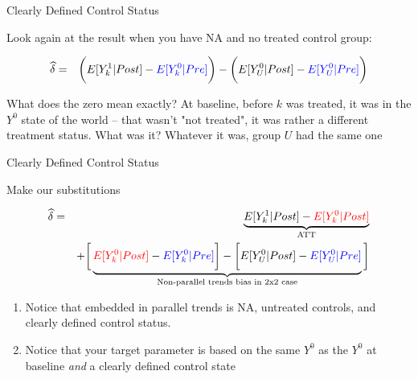 \documentclass{beamer}
\begin{document}
\begin{frame}{Clearly Defined Control Status}

Look again at the result when you have NA and no treated control group:

\begin{eqnarray*}
\widehat{\delta} &=& \bigg ( E[Y^1_k|Post] - \textcolor{blue}{E[Y^0_k|Pre]} \bigg ) - \bigg ( E[Y^0_U | Post ] - \textcolor{blue}{E[ Y^0_U | Pre]} \bigg) \\
\end{eqnarray*}

What does the zero mean exactly?  At baseline, before $k$ was treated, it was in the $Y^0$ state of the world -- that wasn't "not treated", it was rather a different treatment status.  What was it?  Whatever it was, group $U$ had the same one

\end{frame}

\begin{frame}{Clearly Defined Control Status}

Make our substitutions

\begin{eqnarray*}
\widehat{\delta} &=& \underbrace{E[Y^1_k | Post] - \textcolor{red}{E[Y^0_k | Post]}}_{\mathclap{\text{ATT}}} \\
&& + \bigg [  \underbrace{\textcolor{red}{E[Y^0_k | Post]} - \textcolor{blue}{E[Y^0_k | Pre]} \bigg ] - \bigg [ E[Y^0_U | Post] - \textcolor{blue}{E[Y_U^0 | Pre]} }_{\mathclap{\text{Non-parallel trends bias in 2x2 case}}} \bigg ]
\end{eqnarray*}


\begin{enumerate}
\item Notice that embedded in parallel trends is NA, untreated controls, and clearly defined control status. 
\item Notice that your target parameter is based on the same $Y^0$ as the $Y^0$ at baseline \emph{and} a clearly defined control state
\end{enumerate}

\end{frame}
\end{document}
